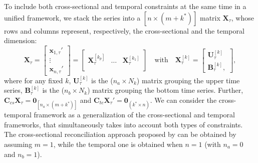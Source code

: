 \documentclass[12pt]{article}
\newcommand{\xvet}{\bm{x}}
\newcommand{\Bvet}{\bm{B}}
\newcommand{\Cvet}{\bm{C}}
\newcommand{\Uvet}{\bm{U}}
\newcommand{\Xvet}{\bm{X}}
\newcommand{\Zerovet}{\bm{0}}
\theoremstyle{definition}
\begin{document}
To include both cross-sectional and temporal constraints at the same time in a unified framework, we stack the series into a $[n \times (m+k^\ast)]$ matrix $\Xvet_\tau$, whose rows and columns represent, respectively, the cross-sectional and the temporal dimension:
\begin{equation}
	\label{eq:Xtau}
	\Xvet_\tau = \begin{bmatrix}
		\xvet_{1,\tau}' \\
		\vdots          \\
		\xvet_{n,\tau}'
	\end{bmatrix} = \begin{bmatrix}
		\Xvet_{\tau}^{[k_p]} & \dots & \Xvet_{\tau}^{[k_1]} \\ \end{bmatrix}
	\quad \text{with} \quad \Xvet_{\tau}^{[k]} = \begin{bmatrix}
		\Uvet_{\tau}^{[k]} \\
		\Bvet_{\tau}^{[k]},
	\end{bmatrix},
\end{equation}
where for any fixed $k$,
$\Uvet_{\tau}^{[k]}$ is the ($n_a\times N_k$) matrix grouping the upper time series, $\Bvet_{\tau}^{[k]}$ is the ($n_b\times N_k$) matrix grouping the bottom time series. Further, $\Cvet_{cs}\Xvet_\tau = \Zerovet_{\left[n_a \times (m+k^\ast)\right]}$ and $\Cvet_{te}\Xvet_\tau' = \Zerovet_{(k^\ast \times n)} $. We can consider the cross-temporal framework as a generalization of the cross-sectional and temporal frameworks, that simultaneously takes into account both types of constraints. The cross-sectional reconciliation approach proposed by \cite{hyndman2011} can be obtained by assuming $m = 1$, while the temporal one \citep{athanasopoulos2017} is obtained when $n = 1$ (with $n_a = 0$ and $n_b = 1$).


\end{document}
